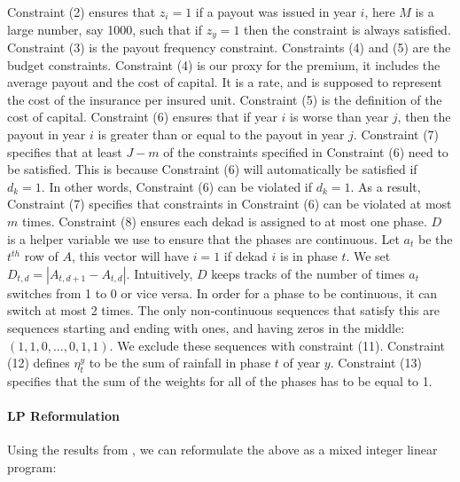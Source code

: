 \documentclass[11pt]{article}
\begin{document}
    Constraint (2) ensures that $z_i = 1$ if a payout was issued in year $i$, here $M$ is a large number, say 1000, such that if $z_y=1$ then the constraint is always satisfied. Constraint (3) is the payout frequency constraint. Constraints (4) and (5) are the budget constraints. Constraint (4) is our proxy for the premium, it includes the average payout and the cost of capital. It is a rate, and is supposed to represent the cost of the insurance per insured unit. Constraint (5) is the definition of the cost of capital. Constraint (6) ensures that if year $i$ is worse than year $j$, then the payout in year $i$ is greater than or equal to the payout in year $j$. Constraint (7) specifies that at least $J-m$ of the constraints specified in Constraint (6) need to be satisfied. This is because Constraint (6) will automatically be satisfied if $d_k=1$. In other words, Constraint (6) can be violated if $d_k=1$. As a result, Constraint (7) specifies that constraints in Constraint (6) can be violated at most $m$ times. Constraint (8) ensures each dekad is assigned to at most one phase. $D$ is a helper variable we use to ensure that the phases are continuous. Let $a_t$ be the $t^{th}$ row of $A$, this vector will have $i=1$ if dekad $i$ is in phase $t$. We set $D_{t,d} = |A_{t,d+1}-A_{t,d}|$. Intuitively, $D$ keeps tracks of the number of times $a_t$ switches from 1 to 0 or vice versa. In order for a phase to be continuous, it can switch at most 2 times. The only non-continuous sequences that satisfy this are sequences starting and ending with ones, and having zeros in the middle: $(1,1,0,...,0,1,1)$. We exclude these sequences with constraint (11). Constraint (12) defines $\eta^y_t$ to be the sum of rainfall in phase $t$ of year $y$. Constraint (13) specifies that the sum of the weights for all of the phases has to be equal to 1.

    \paragraph{LP Reformulation} Using the results from \cite{rockafellar2002conditional}, we can reformulate the above as a mixed integer linear program: 
\end{document}
